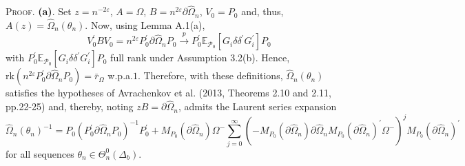 \documentclass[hidelinks, 11 pt, a4paper, pdflatex]{article}
\begin{document}
{  \textsc{Proof}. \textbf{(a)}. Set $z = n^{-2\varepsilon}$, $A = \Omega$, $B = n^{2\varepsilon} \partial \hat{\Omega}_{n}$, $V_{0} = P_{0}$ and, thus, $A(z) = \hat{\Omega}_{n}(\theta _{n})$. Now,
   using Lemma A.1(a),
    \[
     V_{0}^{\prime}BV_{0} = n^{2\varepsilon}P_{0}^{\prime} \partial \hat{\Omega}_{n}P_{0}
                             \overset{p}{\rightarrow}
                             P_{0}^{\prime}\mathbb{E}_{\mathcal{P}_{0}}[G_{i}\delta \delta^{\prime}G_{i}^{\prime}]P_{0}
    \]
   with $P_{0}^{\prime}\mathbb{E}_{\mathcal{P}_{0}}[G_{i}\delta \delta^{\prime}G_{i}^{\prime}]P_{0}$ full rank under Assumption 3.2(b). Hence, $\mathrm{rk}(n^{2\varepsilon}P_{0}^{\prime} \partial \hat{\Omega}_{n}P_{0}) = \bar{r}_{\Omega}$ w.p.a.$1$. Therefore, with these definitions, $\hat{\Omega}_{n}(\theta_{n})$ satisfies the hypotheses of Avrachenkov et al. (2013, Theorems 2.10 and 2.11, pp.22-25) and, thereby, noting $zB = \partial \hat{\Omega}_{n}$, admits the Laurent series expansion
    \[
     \hat{\Omega}_{n}(\theta _{n})^{-1} = P_{0}(P_{0}^{\prime} \partial \hat{\Omega}_{n}P_{0})^{-1}P_{0}^{\prime}
                                           + M_{P_{0}}(\partial \hat{\Omega}_{n})\Omega^{-}
                                             \sum_{j=0}^{\infty}
                                             (-M_{P_{0}}(\partial \hat{\Omega}_{n}) \partial \hat{\Omega}_{n}M_{P_{0}} (\partial \hat{\Omega}_{n})^{\prime}\Omega^{-})^{j}
                                             M_{P_{0}}(\partial \hat{\Omega}_{n})^{\prime}
    \]
   for all sequences $\theta_{n} \in \Theta_{n}^{0}(\Delta_{b})$.

}
\end{document}
